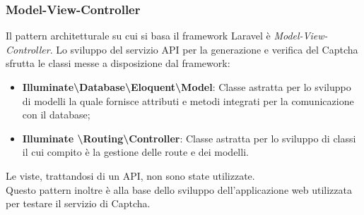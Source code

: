 \subsubsection{Model-View-Controller}
Il pattern architetturale su cui si basa il framework Laravel è \textit{Model-View-Controller}.
Lo sviluppo del servizio API per la generazione e verifica del Captcha sfrutta le classi messe a disposizione dal framework:
\begin{itemize}
    \item \textbf{Illuminate\textbackslash Database\textbackslash Eloquent\textbackslash Model}: Classe astratta per lo sviluppo di modelli la quale fornisce attributi e metodi integrati per la comunicazione con il database;
    \item \textbf{Illuminate \textbackslash Routing\textbackslash Controller}: Classe astratta per lo sviluppo di classi il cui compito è la gestione delle route e dei modelli.
\end{itemize}
Le viste, trattandosi di un API, non sono state utilizzate.\\
Questo pattern inoltre è alla base dello sviluppo dell'applicazione web utilizzata per testare il servizio di Captcha.